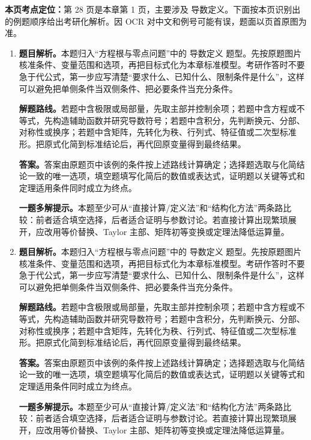 \begin{solutionblock}
\textbf{本页考点定位：}第 28 页是本章第 1 页，主要涉及 导数定义。下面按本页识别出的例题顺序给出考研化解析。因 OCR 对中文和例号可能有误，题面以页首原图为准。

\begin{enumerate}[label=\textbf{例\arabic*.}, leftmargin=2.4em]

\item \textbf{题目解析。}本题归入“方程根与零点问题”中的 导数定义 题型。先按原题图片核准条件、变量范围和选项，再把目标式化为本章标准模型。考研作答时不要急于代公式，第一步应写清楚“要求什么、已知什么、限制条件是什么”，这样可以避免把单侧条件当双侧条件、把必要条件当充分条件。

\textbf{解题路线。}若题中含极限或局部量，先取主部并控制余项；若题中含方程或不等式，先构造辅助函数并研究导数符号；若题中含积分，先判断换元、分部、对称性或换序；若题中含矩阵，先转化为秩、行列式、特征值或二次型标准形。把原式化简到标准结论后，再代回原变量得到最终结果。

\textbf{答案。}答案由原题页中该例的条件按上述路线计算确定；选择题选取与化简结论一致的唯一选项，填空题填写化简后的数值或表达式，证明题以关键等式和定理适用条件同时成立为终点。

\textbf{一题多解提示。}本题至少可从“直接计算/定义法”和“结构化方法”两条路比较：前者适合填空选择，后者适合证明与参数讨论。若直接计算出现繁琐展开，应改用等价替换、Taylor 主部、矩阵初等变换或定理法降低运算量。

\item \textbf{题目解析。}本题归入“方程根与零点问题”中的 导数定义 题型。先按原题图片核准条件、变量范围和选项，再把目标式化为本章标准模型。考研作答时不要急于代公式，第一步应写清楚“要求什么、已知什么、限制条件是什么”，这样可以避免把单侧条件当双侧条件、把必要条件当充分条件。

\textbf{解题路线。}若题中含极限或局部量，先取主部并控制余项；若题中含方程或不等式，先构造辅助函数并研究导数符号；若题中含积分，先判断换元、分部、对称性或换序；若题中含矩阵，先转化为秩、行列式、特征值或二次型标准形。把原式化简到标准结论后，再代回原变量得到最终结果。

\textbf{答案。}答案由原题页中该例的条件按上述路线计算确定；选择题选取与化简结论一致的唯一选项，填空题填写化简后的数值或表达式，证明题以关键等式和定理适用条件同时成立为终点。

\textbf{一题多解提示。}本题至少可从“直接计算/定义法”和“结构化方法”两条路比较：前者适合填空选择，后者适合证明与参数讨论。若直接计算出现繁琐展开，应改用等价替换、Taylor 主部、矩阵初等变换或定理法降低运算量。


\end{enumerate}
\end{solutionblock}
